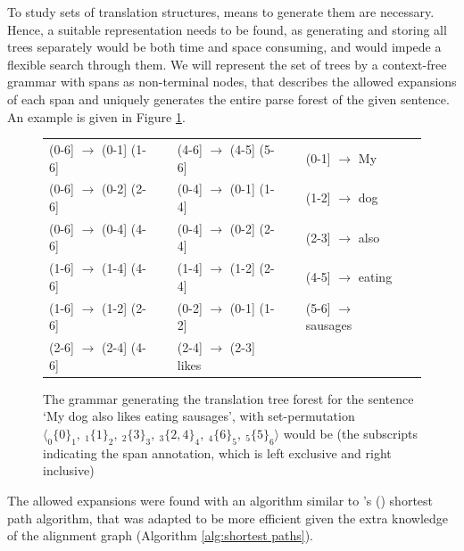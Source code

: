 \documentclass{report}
\theoremstyle{break}
\def\citepos#1{\citeauthor{#1}'s (\citeyear{#1})}
\begin{document}
To study sets of translation structures, means to generate them are necessary. Hence, a suitable representation needs to be found, as generating and storing all trees separately would be both time and space consuming, and would impede a flexible search through them. We will represent the set of trees by a context-free grammar with spans as non-terminal nodes, that describes the allowed expansions of each span and uniquely generates the entire parse forest of the given sentence. An example is given in Figure \ref{fig:grammar}.

\begin{figure}[!ht]\begin{framed}
\small{
\begin{tabular}{llllll}
(0-6] $\rightarrow$ (0-1]  (1-6] && (4-6] $\rightarrow$ (4-5]  (5-6] && (0-1] $\rightarrow$ My\\
(0-6] $\rightarrow$ (0-2]  (2-6] && (0-4] $\rightarrow$ (0-1]  (1-4] && (1-2] $\rightarrow$ dog\\
(0-6] $\rightarrow$ (0-4]  (4-6] && (0-4] $\rightarrow$ (0-2]  (2-4] && (2-3] $\rightarrow$ also\\
(1-6] $\rightarrow$ (1-4]  (4-6] && (1-4] $\rightarrow$ (1-2]  (2-4] && (4-5] $\rightarrow$ eating\\
(1-6] $\rightarrow$ (1-2]  (2-6] && (0-2] $\rightarrow$ (0-1]  (1-2] && (5-6] $\rightarrow$ sausages\\
(2-6] $\rightarrow$ (2-4]  (4-6] && (2-4] $\rightarrow$ (2-3] likes\\
\end{tabular}
\caption{The grammar generating the translation tree forest for the sentence
`My dog also likes eating sausages', with set-permutation $\langle _0\{0\}_1,~ _1\{1\}_2,~ _2\{3\}_3,~ _3\{2,4\}_4, ~_4\{6\}_5,~ _5\{5\}_6\rangle$ would be (the subscripts indicating the span annotation, which is left exclusive and right inclusive)}\label{fig:grammar}
}
\end{framed}
\end{figure}

The allowed expansions were found with an algorithm similar to \citepos{dijkstra1959note} shortest path algorithm, that was adapted to be more efficient given the extra knowledge of the alignment graph (Algorithm \ref{alg:shortest paths}).
\end{document}
